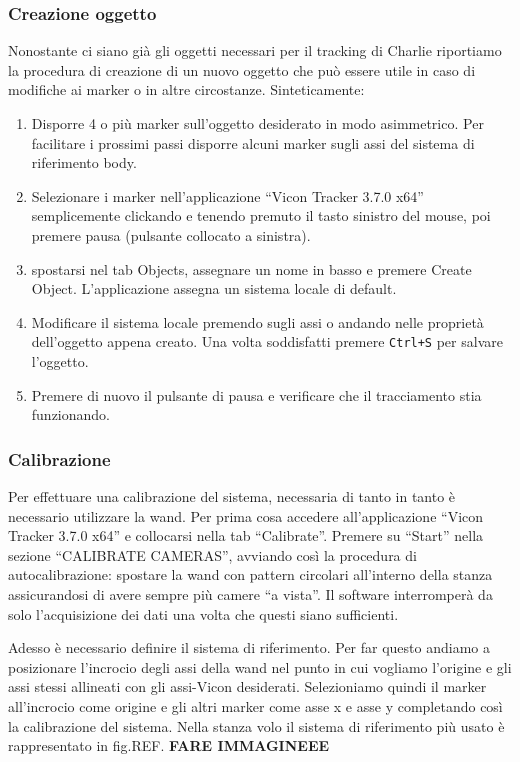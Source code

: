 \subsubsection*{Creazione oggetto}
Nonostante ci siano gi\`a gli oggetti necessari per il tracking di Charlie riportiamo la procedura di creazione di un nuovo oggetto che pu\`o essere utile in caso di modifiche ai marker o in altre circostanze. 
Sinteticamente:
\begin{enumerate}
	\item Disporre 4 o pi\`u marker sull'oggetto desiderato in modo asimmetrico. Per facilitare i prossimi passi disporre alcuni marker sugli assi del sistema di riferimento body.
	
	\item Selezionare i marker nell'applicazione ``Vicon Tracker 3.7.0 x64'' semplicemente clickando e tenendo premuto il tasto sinistro del mouse, poi premere pausa (pulsante collocato a sinistra).
	
	\item spostarsi nel tab Objects, assegnare un nome in basso e premere Create Object. L'applicazione assegna un sistema locale di default.
	
	\item Modificare il sistema locale premendo sugli assi o andando nelle propriet\`a dell'oggetto appena creato. Una volta soddisfatti premere \texttt{Ctrl+S} per salvare l'oggetto.
	
	\item Premere di nuovo il pulsante di pausa e verificare che il tracciamento stia funzionando.
\end{enumerate}

\subsubsection*{Calibrazione}
Per effettuare una calibrazione del sistema, necessaria di tanto in tanto \`e necessario utilizzare la wand. 
Per prima cosa accedere all'applicazione ``Vicon Tracker 3.7.0 x64'' e collocarsi nella tab ``Calibrate''. 
Premere su ``Start'' nella sezione ``CALIBRATE CAMERAS'', avviando cos\`i la procedura di autocalibrazione: spostare la wand con pattern circolari all'interno della stanza assicurandosi di avere sempre pi\`u camere ``a vista''. 
Il software interromper\`a da solo l'acquisizione dei dati una volta che questi siano sufficienti.

Adesso \`e necessario definire il sistema di riferimento. Per far questo andiamo a posizionare l'incrocio degli assi della wand nel punto in cui vogliamo l'origine e gli assi stessi allineati con gli assi-Vicon desiderati.
Selezioniamo quindi il marker all'incrocio come origine e gli altri marker come asse x e asse y completando cos\`i la calibrazione del sistema. 
Nella stanza volo il sistema di riferimento pi\`u usato \`e rappresentato in fig.REF.
\textbf{FARE IMMAGINEEE}


